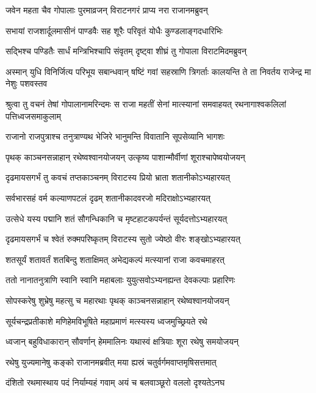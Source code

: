 \twolineshloka
{जवेन महता चैव गोपालाः पुरमाव्रजन्}
{विराटनगरं प्राप्य नरा राजानमब्रुवन्}


\twolineshloka
{सभायां राजशार्दूलमासीनं पाण्डवैः सह}
{शूरैः परिवृतं योधैः कुण्डलाङ्गदधारिभिः}


\twolineshloka
{सद्भिश्च पण्डितैः सार्धं मन्त्रिभिश्चापि संवृतम्}
{दृष्ट्वा शीघ्रं तु गोपाला विराटमिदमब्रुवन्}


\threelineshloka
{अस्मान् युधि विनिर्जित्य परिभूय सबान्धवान्}
{षष्टिं गवां सहस्राणि त्रिगर्ताः कालयन्ति ते}
{ता निवर्तय राजेन्द्र मा नेशुः पशवस्तव}



\threelineshloka
{श्रुत्वा तु वचनं तेषां गोपालानामरिन्दमः}
{स राजा महतीं सेनां मात्स्यानां समवाहयत्}
{रथनागाश्वकलिलां पत्तिध्वजसमाकुलाम्}


\twolineshloka
{राजानो राजपुत्राश्च तनुत्राण्यथ भेजिरे}
{भानुमन्ति विवातानि सूपसेव्यानि भागशः}


\twolineshloka
{पृथक् काञ्चनसन्नाहान् रथेष्वश्वानयोजयन्}
{उत्कृष्य पाशान्मौर्वीणां शूराश्चापेष्वयोजयन्}


\twolineshloka
{दृढमायसगर्भं तु कवचं तप्तकाञ्चनम्}
{विराटस्य प्रियो भ्राता शतानीकोऽभ्यहारयत्}


\twolineshloka
{सर्वभारसहं वर्म कल्याणपटलं दृढम्}
{शतानीकादवरजो मदिराक्षोऽभ्यहारयत्}


\twolineshloka
{उत्सेधे यस्य पद्मानि शतं सौगन्धिकानि च}
{मृष्टहाटकपर्यन्तं सूर्यदत्तोऽभ्यहारयत्}


\twolineshloka
{दृढमायसगर्भं च श्वेतं रुक्मपरिष्कृतम्}
{विराटस्य सुतो ज्येष्ठो वीरः शङ्खोऽभ्यहारयत्}


\twolineshloka
{शतसूर्यं शतावर्तं शतबिन्दु शताक्षिमत्}
{अभेद्यकल्पं मत्स्यानां राजा कवचमाहरत्}


\twolineshloka
{ततो नानातनुत्राणि स्वानि स्वानि महाबलाः}
{युयुत्सवोऽभ्यनह्यन्त देवकल्पाः प्रहारिणः}


\twolineshloka
{सोपस्करेषु शुभ्रेषु महत्सु च महारथाः}
{पृथक् काञ्चनसन्नाहान् रथेष्वश्वानयोजयन्}


\twolineshloka
{सूर्यचन्द्रप्रतीकाशे मणिहेमविभूषिते}
{महाप्रमाणं मत्स्यस्य ध्वजमुच्छ्रियते रथे}


\twolineshloka
{ध्वजान् बहुविधाकारान् सौवर्णान् हेममालिनः}
{यथास्वं क्षत्रियाः शूरा रथेषु समयोजयन्}


\twolineshloka
{रथेषु युज्यमानेषु कङ्को राजानमब्रवीत्}
{मया ह्यस्रं चतुर्वर्गमवाप्तमृषिसत्तमात्}


\twolineshloka
{दंशितो रथमास्थाय पदं निर्याम्यहं गवाम्}
{अयं च बलवाञ्छूरो वललो दृश्यतेऽनघ}


